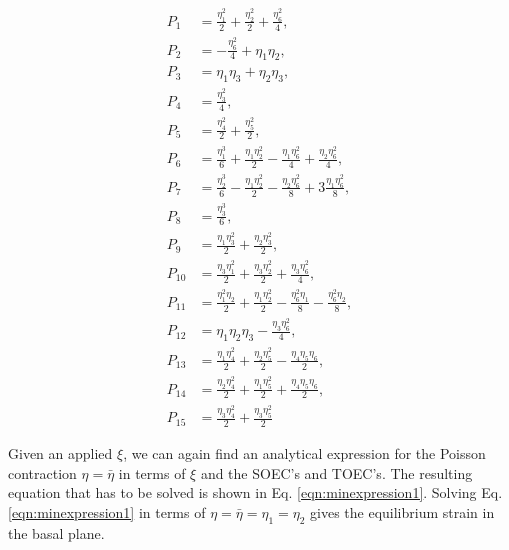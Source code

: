 \documentclass[showpacs,aps,floatfix,prb,reprint,superscriptaddress]{revtex4-1}
\begin{document}
\begin{subequations}
\label{eqn:expansion2detailed} 
\begin{align}
        P_{1} &=\frac{\eta_{1}^2}{2}  + \frac{\eta_{2}^2}{2} + \frac{\eta_{6}^2}{4} ,\\
       P_{2} &=-\frac{\eta_{6}^2}{4} + \eta_{1}\eta_{2} ,\\
				P_{3} &=\eta_{1}\eta_{3} + \eta_{2}\eta_{3} , \\
				P_{4} &=\frac{\eta_{3}^2}{4} , \\
				P_{5} &=\frac{\eta_{4}^2}{2} + \frac{\eta_{5}^2}{2} , \\
				P_{6} &=\frac{\eta_{1}^3}{6} + \frac{\eta_{1}\eta_{2}^2}{2} - \frac{\eta_{1}\eta_{6}^2}{4} + \frac{\eta_{2}\eta_{6}^2}{4} , \\
				P_{7} &=\frac{\eta_{2}^3}{6} - \frac{\eta_{1}\eta_{2}^2}{2} - \frac{\eta_{2}\eta_{6}^2}{8} + 3\frac{\eta_{1}\eta_{6}^2}{8} , \\
				P_{8} &=\frac{\eta_{3}^3}{6} , \\
				P_{9} &=\frac{\eta_{1}\eta_{3}^2}{2} + \frac{\eta_{2}\eta_{3}^2}{2} , \\
				P_{10} &=\frac{\eta_{3}\eta_{1}^2}{2} + \frac{\eta_{3}\eta_{2}^2}{2} + \frac{\eta_{3}\eta_{6}^2}{4} , \\
				P_{11} &=\frac{\eta_{1}^2\eta_{2}}{2} +  \frac{\eta_{1}\eta_{2}^2}{2} - \frac{\eta_{6}^2\eta_{1}}{8} - \frac{\eta_{6}^2\eta_{2}}{8} , \\
				P_{12} &=\eta_{1}\eta_{2}\eta_{3} - \frac{\eta_{3}\eta_{6}^2}{4} , \\
				P_{13} &=\frac{\eta_{1}\eta_{4}^2}{2} + \frac{\eta_{2}\eta_{5}^2}{2} - \frac{\eta_{4}\eta_{5}\eta_{6}}{2} , \\
				P_{14} &=\frac{\eta_{2}\eta_{4}^2}{2} + \frac{\eta_{1}\eta_{5}^2}{2} + \frac{\eta_{4}\eta_{5}\eta_{6}}{2} , \\
				P_{15} &=\frac{\eta_{3}\eta_{4}^2}{2} + \frac{\eta_{3}\eta_{5}^2}{2} 
\end{align}
\end{subequations}

Given an applied $\xi$, we can again find an analytical expression for the Poisson contraction $\eta = \bar{\eta}$ in terms of $\xi$ and the SOEC's and TOEC's. The resulting equation that has to be solved is shown in Eq. \ref{eqn:minexpression1}. Solving Eq. \ref{eqn:minexpression1} in terms of $\eta = \bar{\eta} = \eta_{1} = \eta_{2}$ gives the equilibrium strain in the basal plane.
\end{document}
